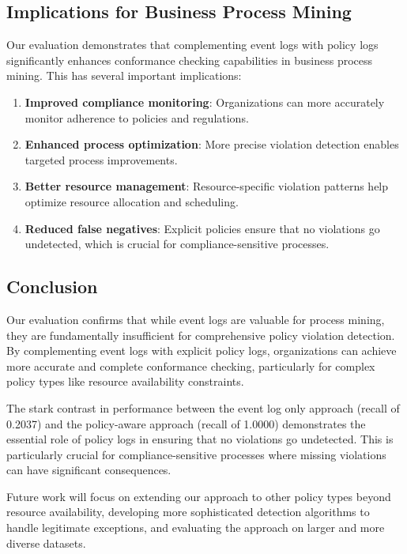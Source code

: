 \subsection{Implications for Business Process Mining}

Our evaluation demonstrates that complementing event logs with policy logs significantly enhances conformance checking capabilities in business process mining. This has several important implications:

\begin{enumerate}
    \item \textbf{Improved compliance monitoring}: Organizations can more accurately monitor adherence to policies and regulations.
    
    \item \textbf{Enhanced process optimization}: More precise violation detection enables targeted process improvements.
    
    \item \textbf{Better resource management}: Resource-specific violation patterns help optimize resource allocation and scheduling.
    
    \item \textbf{Reduced false negatives}: Explicit policies ensure that no violations go undetected, which is crucial for compliance-sensitive processes.
\end{enumerate}

\subsection{Conclusion}

Our evaluation confirms that while event logs are valuable for process mining, they are fundamentally insufficient for comprehensive policy violation detection. By complementing event logs with explicit policy logs, organizations can achieve more accurate and complete conformance checking, particularly for complex policy types like resource availability constraints.

The stark contrast in performance between the event log only approach (recall of 0.2037) and the policy-aware approach (recall of 1.0000) demonstrates the essential role of policy logs in ensuring that no violations go undetected. This is particularly crucial for compliance-sensitive processes where missing violations can have significant consequences.

Future work will focus on extending our approach to other policy types beyond resource availability, developing more sophisticated detection algorithms to handle legitimate exceptions, and evaluating the approach on larger and more diverse datasets.
